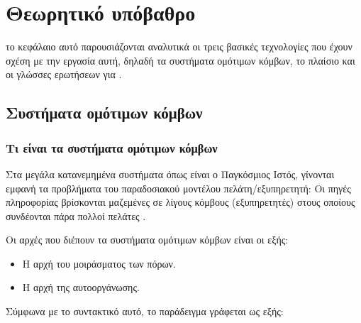 \chapter{Θεωρητικό υπόβαθρο}
το κεφάλαιο αυτό παρουσιάζονται  αναλυτικά οι τρεις
βασικές τεχνολογίες που έχουν σχέση με την εργασία αυτή, δηλαδή τα
συστήματα ομότιμων κόμβων, το πλαίσιο  και οι γλώσσες
ερωτήσεων για .

\section{Συστήματα ομότιμων κόμβων}
\subsection{Τι είναι τα συστήματα ομότιμων κόμβων}
Στα μεγάλα κατανεμημένα συστήματα  όπως είναι ο Παγκόσμιος Ιστός, γίνονται εμφανή τα προβλήματα του παραδοσιακού μοντέλου πελάτη/εξυπηρετητή: Οι πηγές πληροφορίας βρίσκονται μαζεμένες σε
λίγους κόμβους (εξυπηρετητές) στους οποίους συνδέονται πάρα πολλοί
πελάτες \cite{elli05}.

Οι αρχές που διέπουν τα συστήματα ομότιμων κόμβων είναι οι εξής:
\begin{itemize}
\item Η αρχή του μοιράσματος των πόρων.
\item Η αρχή της αυτοοργάνωσης.
\end{itemize}

Σύμφωνα με το συντακτικό αυτό, το παράδειγμα γράφεται ως εξής: 